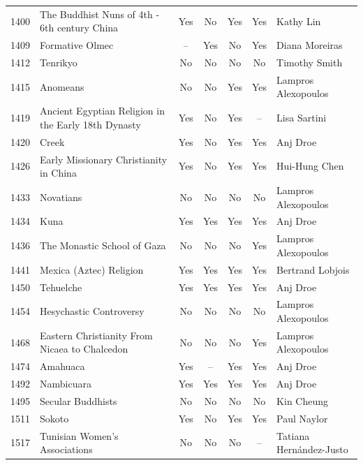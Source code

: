 {\begin{longtable}{rp{3.5cm}ccccp{3cm}}
1400 & {\raggedright The Buddhist Nuns of 4th - 6th century China} & Yes & No & Yes & Yes & {\raggedright Kathy Lin} \\
1409 & {\raggedright Formative Olmec} & -- & Yes & No & Yes & {\raggedright Diana Moreiras} \\
1412 & {\raggedright Tenrikyo} & No & No & No & No & {\raggedright Timothy Smith} \\
1415 & {\raggedright Anomeans} & No & No & Yes & Yes & {\raggedright Lampros Alexopoulos} \\
1419 & {\raggedright Ancient Egyptian Religion in the Early 18th Dynasty} & Yes & No & Yes & -- & {\raggedright Lisa Sartini} \\
1420 & {\raggedright Creek} & Yes & No & Yes & Yes & {\raggedright Anj Droe} \\
1426 & {\raggedright Early Missionary Christianity in China} & Yes & No & Yes & Yes & {\raggedright Hui-Hung Chen} \\
1433 & {\raggedright Novatians} & No & No & No & No & {\raggedright Lampros Alexopoulos} \\
1434 & {\raggedright Kuna} & Yes & Yes & Yes & Yes & {\raggedright Anj Droe} \\
1436 & {\raggedright The Monastic School of Gaza} & No & No & No & Yes & {\raggedright Lampros Alexopoulos} \\
1441 & {\raggedright Mexica (Aztec) Religion} & Yes & Yes & Yes & Yes & {\raggedright Bertrand Lobjois} \\
1450 & {\raggedright Tehuelche} & Yes & Yes & Yes & Yes & {\raggedright Anj Droe} \\
1454 & {\raggedright Hesychastic Controversy} & No & No & No & No & {\raggedright Lampros Alexopoulos} \\
1468 & {\raggedright Eastern Christianity From Nicaea to Chalcedon} & No & No & No & Yes & {\raggedright Lampros Alexopoulos} \\
1474 & {\raggedright Amahuaca} & Yes & -- & Yes & Yes & {\raggedright Anj Droe} \\
1492 & {\raggedright Nambicuara} & Yes & Yes & Yes & Yes & {\raggedright Anj Droe} \\
1495 & {\raggedright Secular Buddhists} & No & No & No & No & {\raggedright Kin Cheung} \\
1511 & {\raggedright Sokoto} & Yes & No & Yes & Yes & {\raggedright Paul Naylor} \\
1517 & {\raggedright Tunisian Women's Associations} & No & No & No & -- & {\raggedright Tatiana Hernández-Justo} \\

\end{longtable}}
